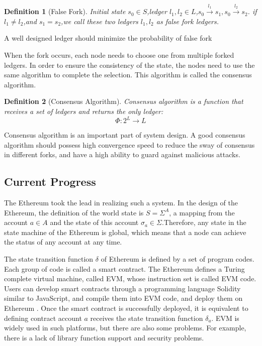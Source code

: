 \documentclass[UTF8,nofonts]{article}
\newtheorem{definition}{Definition}[section]
\begin{document}
\begin{multicols}{2}
\begin{definition}[False Fork] \label{def:falsefork}
 Initial state $s_{0} \in S$,ledger $l_{1},l_{2} \in L$,$s_{0}\overset{l_{1}}{\rightarrow}s_{1}, s_{0}\overset{l_{2}}{\rightarrow}s_{2}$. if $l_{1} \neq l_{2}$,and $s_{1}=s_{2}$,we call these two ledgers $l_{1} ,l_{2}$ as false fork ledgers.
\end{definition}

A well designed ledger should minimize the probability of false fork

When the fork occurs, each node needs to choose one from multiple forked ledgers. In order to ensure the consistency of the state, the nodes need to use the same algorithm to complete the selection. This algorithm is called the consensus algorithm.

\begin{definition}[Consensus Algorithm] \label{def:consensus}
Consensus algorithm is a function that receives a set of ledgers and returns the only ledger:
$$\Phi: 2^{L} \rightarrow L$$
\end{definition}

Consensus algorithm is an important part of system design. A good consensus algorithm should possess high convergence speed to reduce the sway of consensus in different forks, and have a high ability to guard against malicious attacks.

\subsection{Current Progress}
The Ethereum \cite{buterin2017ethereum}took the lead in realizing such a system. In the design of the Ethereum, the definition of the world state is $S = \Sigma^{A}$, a mapping from the account $a \in A$ and the state of this account $\sigma_{a} \in \Sigma$.Therefore, any state in the state machine of the Ethereum is global, which means that a node can achieve the status of any account at any time.

The state transition function $\delta$ of Ethereum is defined by a set of program codes. Each group of code is called a smart contract. The Ethereum defines a Turing complete virtual machine, called EVM, whose instruction set is called EVM code. Users can develop smart contracts through a programming language Solidity similar to JavaScript, and compile them into EVM code, and deploy them on Ethereum \cite{dannen2017introducing}. Once the smart contract is successfully deployed, it is equivalent to defining contract account  $a$ receives the state transition function $\delta_{a}$.
EVM is widely used in such platforms, but there are also some problems. For example, there is a lack of library function support and security problems.


\end{multicols}
\end{document}

